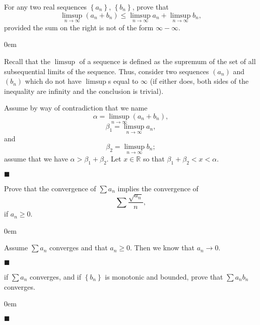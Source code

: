 \documentclass[12pt]{article}
\renewcommand{\qed}{\hfill$\blacksquare$}
\renewenvironment{proof}{\begin{addmargin}[1em]{0em}\begin{newproof}}{\end{newproof}\end{addmargin}\qed}
\newenvironment{problem}[2][Exercise]{\begin{trivlist}
\item[\hskip \labelsep {\bfseries #1}\hskip \labelsep {\bfseries #2.}]}{\end{trivlist}}
\begin{document}
\begin{problem}{3.5}
For any two real sequences $\left\{a_n\right\}$, $\left\{b_n\right\}$, prove that $$ \limsup_{n\rightarrow \infty} \left(a_n + b_n\right) \leq \limsup_{n\rightarrow \infty} a_n + \limsup_{n\rightarrow \infty} b_n, $$ provided the sum on the right is not of the form $\infty - \infty$.
\end{problem}
\begin{proof}
Recall that the $\limsup$ of a sequence is defined as the supremum of the set of all subsequential limits of the sequence. Thus, consider two sequences $\left(a_n\right)$ and $\left(b_n\right)$ which do not have $\limsup$s equal to $\infty$ (if either does, both sides of the inequality are infinity and the conclusion is trivial).

Assume by way of contradiction that we name $$ \alpha = \limsup_{n\rightarrow \infty} \left(a_n+b_n\right),$$ $$ \beta_1 = \limsup_{n\rightarrow \infty} a_n, $$ and $$\beta_2 = \limsup_{n\rightarrow \infty} b_n; $$ assume that we have $\alpha > \beta_1 + \beta_2 $. Let $x\in \mathbb{R}$ so that $\beta_1 + \beta_2 < x < \alpha$. 
\end{proof}





\begin{problem}{3.7}
Prove that the convergence of $\sum a_n$ implies the convergence of $$ \sum \frac{\sqrt{a_n}}{n}, $$ if $a_n \geq 0$.
\end{problem}
\begin{proof}
	Assume $\sum a_n$ converges and that $a_n \geq 0$. Then we know that $a_n \rightarrow 0$.
\end{proof}





\begin{problem}{3.8}
if $\sum a_n$ converges, and if $\left\{b_n\right\}$ is monotonic and bounded, prove that $\sum a_n b_n$ converges.
\end{problem}
\begin{proof}

\end{proof}
\end{document}
